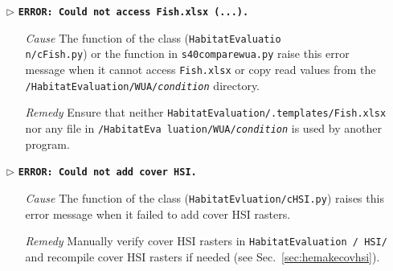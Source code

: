 \begin{itemize}
		\item[$\triangleright$]\textbf{\texttt{ERROR: Could not access Fish.xlsx (...).}}
	\begin{itemize}
		\item[\textit{Cause}\hspace{0.27cm}] The  function of the  class (\texttt{HabitatEvaluatio}\\\texttt{n/cFish.py}) or the  function in \texttt{s40{\myUnderscore}compare{\myUnderscore}wua.py} raise this error message when it cannot access \texttt{Fish.xlsx} or copy read values from the \texttt{/HabitatEvaluation/WUA/\textit{condition}} directory.
		\item[\textit{Remedy}] Ensure that neither \texttt{HabitatEvaluation/.templates/Fish.xlsx} nor any file in \texttt{/HabitatEva luation/WUA/\textit{condition}} is used by another program.\\
	\end{itemize}
	
	\item[$\triangleright$]\textbf{\texttt{ERROR: Could not add cover HSI.}}
	\begin{itemize}
		\item[\textit{Cause}\hspace{0.27cm}] The  function of the  class (\texttt{HabitatEvluation/cHSI.py}) raises this error message when it failed to add cover HSI rasters.
		\item[\textit{Remedy}] Manually verify cover HSI rasters in \texttt{HabitatEvaluation / HSI/} and recompile cover HSI rasters if needed (see Sec.~\ref{sec:hemakecovhsi}).\\
	\end{itemize}		
	

\end{itemize}
